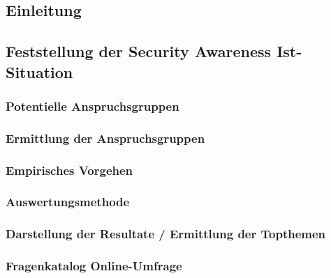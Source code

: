 \documentclass[../../main.tex]{subfiles}
\begin{document}
\subsection{Einleitung}


\subsection{Feststellung der Security Awareness Ist-Situation}


\subsubsection{Potentielle Anspruchsgruppen}


\subsubsection{Ermittlung der Anspruchsgruppen}


\subsubsection{Empirisches Vorgehen}


\subsubsection{Auswertungsmethode}


\subsubsection{Darstellung der Resultate / Ermittlung der Topthemen}


\subsubsection{Fragenkatalog Online-Umfrage}

\end{document}
